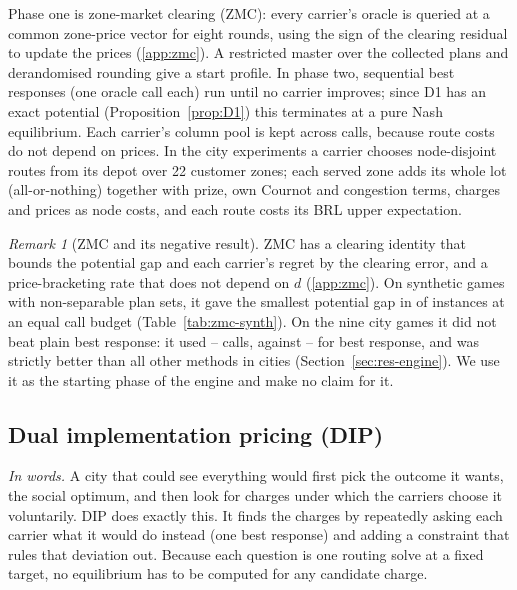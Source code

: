\documentclass[preprint,12pt]{elsarticle}
\theoremstyle{definition}
\theoremstyle{remark}
\newtheorem{remark}[theorem]{Remark}
\begin{document}
Phase one is zone-market clearing (ZMC): every carrier's oracle is queried at a common zone-price vector for eight rounds, using the sign of the clearing residual to update the prices (\ref{app:zmc}). A restricted master over the collected plans and derandomised rounding give a start profile. In phase two, sequential best responses (one oracle call each) run until no carrier improves; since D1 has an exact potential (Proposition~\ref{prop:D1}) this terminates at a pure Nash equilibrium. Each carrier's column pool is kept across calls, because route costs do not depend on prices. In the city experiments a carrier chooses node-disjoint routes from its depot over 22 customer zones; each served zone adds its whole lot (all-or-nothing) together with prize, own Cournot and congestion terms, charges and prices as node costs, and each route costs its BRL upper expectation.

\begin{remark}[ZMC and its negative result]\label{rem:zmc}
ZMC has a clearing identity that bounds the potential gap and each carrier's regret by the clearing error, and a price-bracketing rate that does not depend on $d$ (\ref{app:zmc}). On synthetic games with non-separable plan sets, it gave the smallest potential gap in \ZMCsynthWins{} of \ZMCsynthN{} instances at an equal call budget (Table~\ref{tab:zmc-synth}). On the nine city games it did not beat plain best response: it used \EfiveCallsZMCmin--\EfiveCallsZMCmax{} calls, against \EfiveCallsBRmin--\EfiveCallsBRmax{} for best response, and was strictly better than all other methods in \EfiveZMCstrictBestN{} cities (Section~\ref{sec:res-engine}). We use it as the starting phase of the engine and make no claim for it.
\end{remark}


\subsection{Dual implementation pricing (DIP)}\label{sec:dip}

\emph{In words.} A city that could see everything would first pick the outcome it wants, the social optimum, and then look for charges under which the carriers choose it voluntarily. DIP does exactly this. It finds the charges by repeatedly asking each carrier what it would do instead (one best response) and adding a constraint that rules that deviation out. Because each question is one routing solve at a fixed target, no equilibrium has to be computed for any candidate charge.
\end{document}
